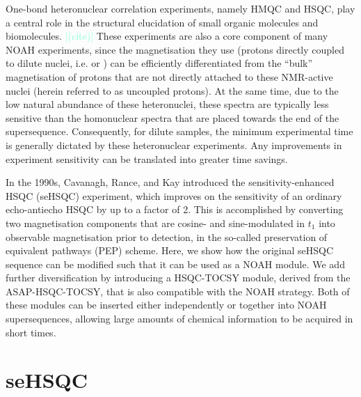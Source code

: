 \documentclass[11pt]{article}
\newcommand*{\carbon}{\ce{^{13}C}}
\newcommand*{\nitrogen}{\ce{^{15}N}}
\newcommand*{\hl}[1]{\textcolor{Aquamarine}{[#1]}}
\begin{document}
One-bond heteronuclear correlation experiments, namely HMQC and HSQC, play a central role in the structural elucidation of small organic molecules and biomolecules.
\hl{(cite)}
These experiments are also a core component of many NOAH experiments, since the magnetisation they use (protons directly coupled to dilute nuclei, i.e. \carbon{} or \nitrogen{}) can be efficiently differentiated from the ``bulk'' magnetisation of protons that are not directly attached to these NMR-active nuclei (herein referred to as uncoupled protons).\autocite{Garbow1982CPL, Kupce2019JMR}
At the same time, due to the low natural abundance of these heteronuclei, these spectra are typically less sensitive than the homonuclear spectra that are placed towards the end of the supersequence.
Consequently, for dilute samples, the minimum experimental time is generally dictated by these heteronuclear experiments.
Any improvements in experiment sensitivity can be translated into greater time savings.

In the 1990s, Cavanagh, Rance, and Kay introduced the sensitivity-enhanced HSQC (seHSQC) experiment, which improves on the sensitivity of an ordinary echo-antiecho HSQC by up to a factor of 2.\autocite{sehsqc}
This is accomplished by converting two magnetisation components that are cosine- and sine-modulated in $t_1$ into observable magnetisation prior to detection, in the so-called preservation of equivalent pathways (PEP) scheme.
Here, we show how the original seHSQC sequence can be modified such that it can be used as a NOAH module.
We add further diversification by introducing a HSQC-TOCSY module, derived from the ASAP-HSQC-TOCSY,\autocite{Becker2019JMR} that is also compatible with the NOAH strategy.
Both of these modules can be inserted either independently or together into NOAH supersequences, allowing large amounts of chemical information to be acquired in short times.

\section*{\texorpdfstring{\carbon{}}{13C} seHSQC}
\end{document}
